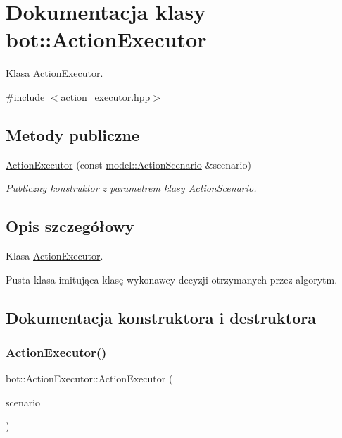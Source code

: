 \hypertarget{classbot_1_1ActionExecutor}{}\section{Dokumentacja klasy bot\+:\+:Action\+Executor}
\label{classbot_1_1ActionExecutor}


Klasa \hyperlink{classbot_1_1ActionExecutor}{Action\+Executor}.  




{\ttfamily \#include $<$action\+\_\+executor.\+hpp$>$}

\subsection*{Metody publiczne}
\begin{DoxyCompactItemize}
\item 
\hyperlink{classbot_1_1ActionExecutor_ae65d80e86469f29c5ad3794666b8d5c5}{Action\+Executor} (const \hyperlink{action_8hpp_a052d176abf53b10863680ac55e7ba40d}{model\+::\+Action\+Scenario} \&scenario)
\begin{DoxyCompactList}\small\item\em Publiczny konstruktor z parametrem klasy Action\+Scenario. \end{DoxyCompactList}\end{DoxyCompactItemize}


\subsection{Opis szczegółowy}
Klasa \hyperlink{classbot_1_1ActionExecutor}{Action\+Executor}. 

Pusta klasa imitująca klasę wykonawcy decyzji otrzymanych przez algorytm. 

\subsection{Dokumentacja konstruktora i destruktora}
\mbox{\label{classbot_1_1ActionExecutor_ae65d80e86469f29c5ad3794666b8d5c5}} 
\subsubsection{\texorpdfstring{Action\+Executor()}{ActionExecutor()}}
{\footnotesize\ttfamily bot\+::\+Action\+Executor\+::\+Action\+Executor (\begin{DoxyParamCaption}\item[{const \hyperlink{action_8hpp_a052d176abf53b10863680ac55e7ba40d}{model\+::\+Action\+Scenario} \&}]{scenario }\end{DoxyParamCaption})\hspace{0.3cm}{\ttfamily [inline]}}




